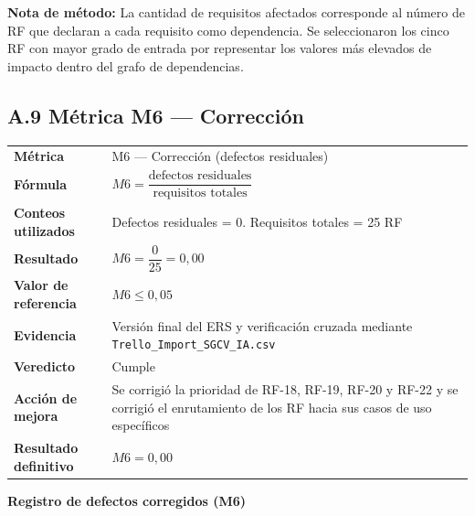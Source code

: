 \vspace{0.2cm}

\noindent\footnotesize
\textbf{Nota de método:}
La cantidad de requisitos afectados corresponde al número de RF
que declaran a cada requisito como dependencia. Se seleccionaron
los cinco RF con mayor grado de entrada por representar los valores
más elevados de impacto dentro del grafo de dependencias.
\normalsize

\subsection*{A.9 Métrica M6 — Corrección}

\begin{tabular}{p{3.2cm}p{9.5cm}}
\hline
\textbf{Métrica} &
M6 — Corrección (defectos residuales) \\

\textbf{Fórmula} &
$M6 =
\dfrac{\text{defectos residuales}}
{\text{requisitos totales}}$ \\

\textbf{Conteos utilizados} &
Defectos residuales = 0. \newline
Requisitos totales = 25 RF \\

\textbf{Resultado} &
$M6=\dfrac{0}{25}=0{,}00$ \\

\textbf{Valor de referencia} & $M6\leq0{,}05$ \\

\textbf{Evidencia} &
Versión final del ERS y verificación cruzada mediante
\texttt{Trello\_Import\_SGCV\_IA.csv} \\

\textbf{Veredicto} & Cumple \\

\textbf{Acción de mejora} &
Se corrigió la prioridad de RF-18, RF-19, RF-20 y RF-22 y se
corrigió el enrutamiento de los RF hacia sus casos de uso específicos \\

\textbf{Resultado definitivo} &
$M6=0{,}00$ \\

\hline
\end{tabular}

\vspace{0.3cm}

\noindent\textbf{Registro de defectos corregidos (M6)}

